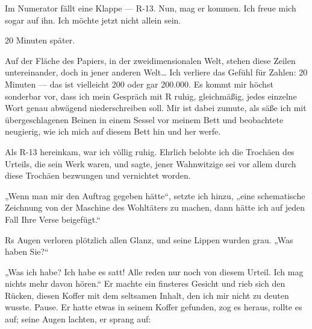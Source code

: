 Im Numerator fällt eine Klappe — R-13. Nun, mag er kommen. Ich
freue mich sogar auf ihn. Ich möchte jetzt nicht allein sein.

20 Minuten später.

Auf der Fläche des Papiers, in der zweidimensionalen Welt, stehen
diese Zeilen untereinander, doch in jener anderen Welt\ldots{} Ich
verliere das Gefühl für Zahlen: 20 Minuten — das ist vielleicht 200
oder gar 200.000. Es kommt mir höchst sonderbar vor, dass ich mein
Gespräch mit R ruhig, gleichmäßig, jedes einzelne Wort genau
abwägend niederschreiben soll. Mir ist dabei zumute, als säße ich
mit übergeschlagenen Beinen in einem Sessel vor meinem Bett und
beobachtete neugierig, wie ich mich auf diesem Bett hin und her
werfe.

Als R-13 hereinkam, war ich völlig ruhig. Ehrlich belobte ich die
Trochäen des Urteils, die sein Werk waren, und sagte, jener
Wahnwitzige sei vor allem durch diese Trochäen bezwungen und
vernichtet worden.

„Wenn man mir den Auftrag gegeben hätte“, setzte ich hinzu, „eine
schematische Zeichnung von der Maschine des Wohltäters zu machen,
dann hätte ich auf jeden Fall Ihre Verse beigefügt.“

Rs Augen verloren plötzlich allen Glanz, und seine Lippen wurden
grau. „Was haben Sie?“

„Was ich habe? Ich habe es satt! Alle reden nur noch von diesem
Urteil. Ich mag nichts mehr davon hören.“ Er machte ein finsteres
Gesicht und rieb sich den Rücken, diesen Koffer mit dem seltsamen
Inhalt, den ich mir nicht zu deuten wusste. Pause. Er hatte etwas
in seinem Koffer gefunden, zog es heraus, rollte es auf; seine
Augen lachten, er sprang auf:

